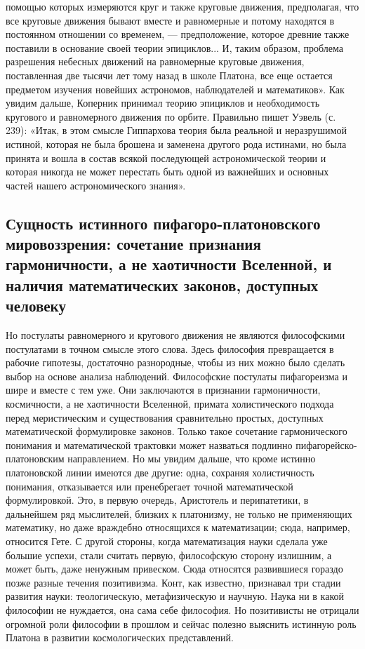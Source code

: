 помощью которых измеряются круг и также круговые движения,
предполагая, что все круговые движения бывают вместе и равномерные и
потому находятся в постоянном отношении со временем, ---
предположение, которое древние также поставили в основание своей
теории эпициклов... И, таким образом, проблема разрешения небесных
движений на равномерные круговые движения, поставленная две тысячи лет
тому назад в школе Платона, все еще остается предметом изучения
новейших астрономов, наблюдателей и математиков». Как увидим дальше,
Коперник принимал теорию эпициклов и необходимость кругового и
равномерного движения по орбите. Правильно пишет Уэвель (с. 239):
«Итак, в этом смысле Гиппархова теория была реальной и неразрушимой
истиной, которая не была брошена и заменена другого рода истинами, но
была принята и вошла в состав всякой последующей астрономической
теории и которая никогда не может перестать быть одной из важнейших и
основных частей нашего астрономического знания».

\subsection{Сущность истинного пифагоро-платоновского мировоззрения:
сочетание признания гармоничности, а не хаотичности Вселенной,
и наличия математических законов, доступных человеку}

Но постулаты равномерного и кругового движения не являются
философскими постулатами в точном смысле этого слова. Здесь философия
превращается в рабочие гипотезы, достаточно разнородные, чтобы из них
можно было сделать выбор на основе анализа наблюдений. Философские
постулаты пифагореизма и шире и вместе с тем уже. Они заключаются в
признании гармоничности, космичности, а не хаотичности Вселенной,
примата холистического подхода перед меристическим и существования
сравнительно простых, доступных математической формулировке законов.
Только такое сочетание гармонического понимания и математической
трактовки может назваться подлинно пифагорейско-платоновским
направлением. Но мы увидим дальше, что кроме истинно платоновской
линии имеются две другие: одна, сохраняя холистичность понимания,
отказывается или пренебрегает точной математической формулировкой.
Это, в первую очередь, Аристотель и перипатетики, в дальнейшем ряд
мыслителей, близких к платонизму, не только не применяющих математику,
но даже враждебно относящихся к математизации; сюда, например,
относится Гете. С другой стороны, когда математизация науки сделала
уже большие успехи, стали считать первую, философскую сторону
излишним, а может быть, даже ненужным привеском. Сюда относятся
развившиеся гораздо позже разные течения позитивизма. Конт, как
известно, признавал три стадии развития науки: теологическую,
метафизическую и научную. Наука ни в какой философии не нуждается, она
сама себе философия. Но позитивисты не отрицали огромной роли
философии в прошлом и сейчас полезно выяснить истинную роль Платона в
развитии космологических представлений.

